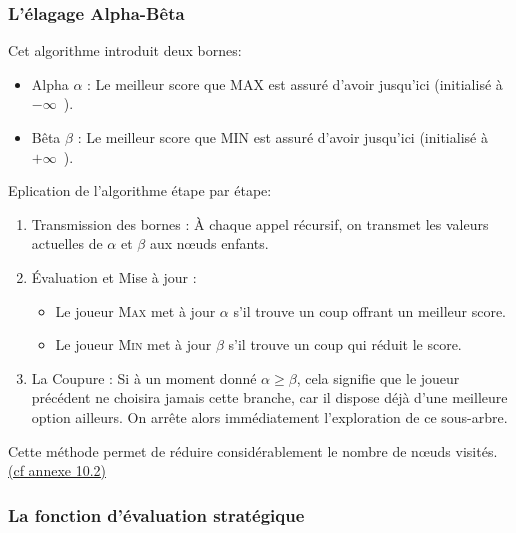 \documentclass{article}
\begin{document}
\subsubsection{L'élagage Alpha-Bêta}
Cet algorithme introduit deux bornes: 
\begin{itemize}
    \item Alpha $\alpha$ : Le meilleur score que MAX est assuré d'avoir jusqu'ici (initialisé à $-\infty$\ ).
    \item Bêta $\beta$ : Le meilleur score que MIN est assuré d'avoir jusqu'ici (initialisé à $+\infty$\ ).
\end{itemize}
Eplication de l'algorithme étape par étape: 
\begin{enumerate}
\item Transmission des bornes : À chaque appel récursif, on transmet les valeurs actuelles de $\alpha$ et $\beta$ aux nœuds enfants.
\item Évaluation et Mise à jour :\begin{itemize}\item Le joueur \textsc{Max} met à jour $\alpha$ s'il trouve un coup offrant un meilleur score.
\item Le joueur \textsc{Min} met à jour $\beta$ s'il trouve un coup qui réduit le score.
\end{itemize}
\item La Coupure : Si à un moment donné $\alpha \ge \beta$, cela signifie que le joueur précédent ne choisira jamais cette branche, car il dispose déjà d'une meilleure option ailleurs. On arrête alors immédiatement l'exploration de ce sous-arbre.
\end{enumerate}
Cette méthode permet de réduire considérablement le nombre de nœuds visités. \hyperref[alg:alphabeta]{(cf annexe 10.2)}


\subsubsection{La fonction d'évaluation stratégique}
\end{document}
